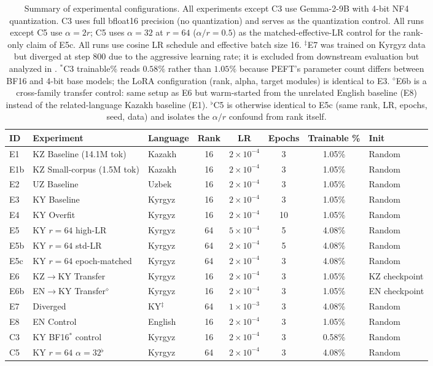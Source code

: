 \documentclass[11pt]{article}
\begin{document}
\begin{table}[t]
\centering
\small
\begin{tabular}{l l l c c c c l}
\toprule
\textbf{ID} & \textbf{Experiment} & \textbf{Language} & \textbf{Rank} & \textbf{LR} & \textbf{Epochs} & \textbf{Trainable \%} & \textbf{Init} \\
\midrule
E1 & KZ Baseline (14.1M tok) & Kazakh & 16 & $2{\times}10^{-4}$ & 3 & 1.05\% & Random \\
E1b & KZ Small-corpus (1.5M tok) & Kazakh & 16 & $2{\times}10^{-4}$ & 3 & 1.05\% & Random \\
E2 & UZ Baseline & Uzbek & 16 & $2{\times}10^{-4}$ & 3 & 1.05\% & Random \\
E3 & KY Baseline & Kyrgyz & 16 & $2{\times}10^{-4}$ & 3 & 1.05\% & Random \\
E4 & KY Overfit & Kyrgyz & 16 & $2{\times}10^{-4}$ & 10 & 1.05\% & Random \\
E5 & KY $r{=}64$ high-LR & Kyrgyz & 64 & $5{\times}10^{-4}$ & 5 & 4.08\% & Random \\
E5b & KY $r{=}64$ std-LR & Kyrgyz & 64 & $2{\times}10^{-4}$ & 5 & 4.08\% & Random \\
E5c & KY $r{=}64$ epoch-matched & Kyrgyz & 64 & $2{\times}10^{-4}$ & 3 & 4.08\% & Random \\
E6 & KZ$\rightarrow$KY Transfer & Kyrgyz & 16 & $2{\times}10^{-4}$ & 3 & 1.05\% & KZ checkpoint \\
E6b & EN$\rightarrow$KY Transfer$^\diamond$ & Kyrgyz & 16 & $2{\times}10^{-4}$ & 3 & 1.05\% & EN checkpoint \\
E7 & Diverged & KY$^\ddagger$ & 64 & $1{\times}10^{-3}$ & 3 & 4.08\% & Random \\
E8 & EN Control & English & 16 & $2{\times}10^{-4}$ & 3 & 1.05\% & Random \\
C3 & KY BF16$^\ast$ control & Kyrgyz & 16 & $2{\times}10^{-4}$ & 3 & 0.58\% & Random \\
C5 & KY $r{=}64$ $\alpha{=}32$$^\flat$ & Kyrgyz & 64 & $2{\times}10^{-4}$ & 3 & 4.08\% & Random \\
\bottomrule
\end{tabular}
\caption{Summary of experimental configurations. All experiments except C3 use Gemma-2-9B with 4-bit NF4 quantization. C3 uses full bfloat16 precision (no quantization) and serves as the quantization control. All runs except C5 use $\alpha = 2r$; C5 uses $\alpha{=}32$ at $r{=}64$ ($\alpha/r=0.5$) as the matched-effective-LR control for the rank-only claim of E5c. All runs use cosine LR schedule and effective batch size 16. $^\ddagger$E7 was trained on Kyrgyz data but diverged at step 800 due to the aggressive learning rate; it is excluded from downstream evaluation but analyzed in . $^\ast$C3 trainable\% reads $0.58\%$ rather than $1.05\%$ because PEFT's parameter count differs between BF16 and 4-bit base models; the LoRA configuration (rank, alpha, target modules) is identical to E3. $^\diamond$E6b is a cross-family transfer control: same setup as E6 but warm-started from the unrelated English baseline (E8) instead of the related-language Kazakh baseline (E1). $^\flat$C5 is otherwise identical to E5c (same rank, LR, epochs, seed, data) and isolates the $\alpha/r$ confound from rank itself.}

\end{table}
\end{document}
